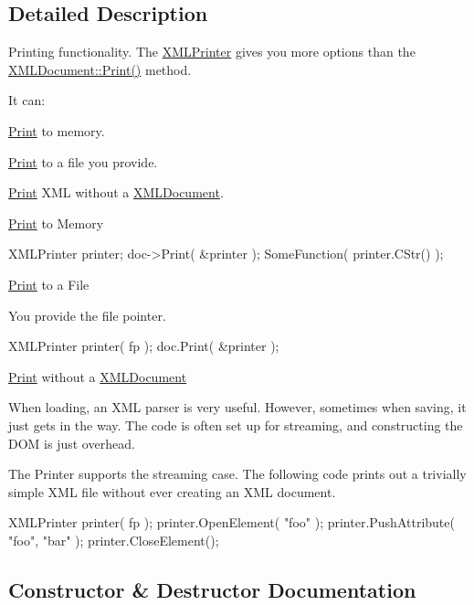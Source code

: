 \subsection{Detailed Description}
Printing functionality. The \hyperlink{classtinyxml2_1_1XMLPrinter}{X\+M\+L\+Printer} gives you more options than the \hyperlink{classtinyxml2_1_1XMLDocument_a2e57602756e197341711a4a0b84c52c5}{X\+M\+L\+Document\+::\+Print()} method.

It can\+:
\begin{DoxyEnumerate}
\item \hyperlink{classPrint}{Print} to memory.
\item \hyperlink{classPrint}{Print} to a file you provide.
\item \hyperlink{classPrint}{Print} X\+ML without a \hyperlink{classtinyxml2_1_1XMLDocument}{X\+M\+L\+Document}.
\end{DoxyEnumerate}

\hyperlink{classPrint}{Print} to Memory

\begin{DoxyVerb}XMLPrinter printer;
doc->Print( &printer );
SomeFunction( printer.CStr() );
\end{DoxyVerb}


\hyperlink{classPrint}{Print} to a File

You provide the file pointer. \begin{DoxyVerb}XMLPrinter printer( fp );
doc.Print( &printer );
\end{DoxyVerb}


\hyperlink{classPrint}{Print} without a \hyperlink{classtinyxml2_1_1XMLDocument}{X\+M\+L\+Document}

When loading, an X\+ML parser is very useful. However, sometimes when saving, it just gets in the way. The code is often set up for streaming, and constructing the D\+OM is just overhead.

The Printer supports the streaming case. The following code prints out a trivially simple X\+ML file without ever creating an X\+ML document.

\begin{DoxyVerb}XMLPrinter printer( fp );
printer.OpenElement( "foo" );
printer.PushAttribute( "foo", "bar" );
printer.CloseElement();
\end{DoxyVerb}
 

\subsection{Constructor \& Destructor Documentation}
\mbox{\label{classtinyxml2_1_1XMLPrinter_ad1eb8de568ceac1429cf04c66a349bd6}} 
